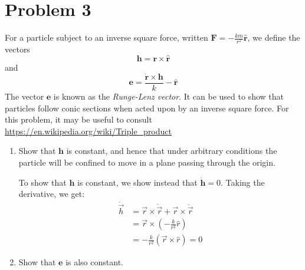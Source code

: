 \documentclass[10pt]{article}
\begin{document}
	\pagebreak
	\section*{Problem 3}
	For a particle subject to an inverse square force, written $\mathbf F = -\frac{km}{r^2} \mathbf{\hat{r}}$, 
	we define the vectors
	\[ \mathbf{h = r \times \hat{r}}\]
	and 
	\[ \mathbf e = \frac{\mathbf{\dot r \times h}}{k} - \hat{\mathbf{r}}\]
	The vector $\mathbf e$ is known as the \textit{Runge-Lenz vector}. It can be used to show that particles 
	follow conic sections when acted upon by an inverse square force. For this problem, it may be useful to 
	consult \url{https://en.wikipedia.org/wiki/Triple_product}
	\begin{enumerate}[label=\alph*)]
			\item Show that $\mathbf h$ is constant, and hence that under arbitrary conditions the particle
					will be confined to move in a plane passing through the origin.

					\begin{solution}
							To show that $\mathbf h$ is constant, we show instead that $\dot{\mathbf h} = 0$. 
							Taking the derivative, we get:
							\begin{align*}
									\dot{\vec h} &= \vec r \times \dot{\vec r} + \vec{r} \times \ddot{\vec{r}}\\
									&= \vec r  \times \left( -\frac{k}{r^2}\hat{r} \right)  \\
									&= -\frac{k}{r^2}(\vec r \times \hat{r}) = 0
							\end{align*}
					\end{solution}
			\item Show that $\mathbf e$ is also constant.
					

\end{enumerate}
\end{document}
